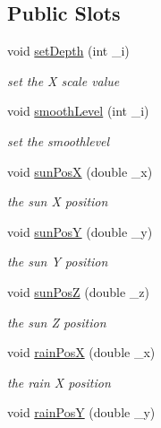 \subsection*{Public Slots}
\begin{DoxyCompactItemize}
\item 
void \hyperlink{classGLWindow_aa977ee3b936a08d1dfc675ac8a2eccad}{setDepth} (int \_\-i)
\begin{DoxyCompactList}\small\item\em set the X scale value \item\end{DoxyCompactList}\item 
void \hyperlink{classGLWindow_a2064b4f973be3388c40bedb9ba27df1f}{smoothLevel} (int \_\-i)
\begin{DoxyCompactList}\small\item\em set the smoothlevel \item\end{DoxyCompactList}\item 
void \hyperlink{classGLWindow_ac04a06844d575e15c9c4d367bec34721}{sunPosX} (double \_\-x)
\begin{DoxyCompactList}\small\item\em the sun X position \item\end{DoxyCompactList}\item 
void \hyperlink{classGLWindow_abd78e6478800ee61d631edbb85307019}{sunPosY} (double \_\-y)
\begin{DoxyCompactList}\small\item\em the sun Y position \item\end{DoxyCompactList}\item 
void \hyperlink{classGLWindow_a56ed4affeadf595cc03e4728fc1a1611}{sunPosZ} (double \_\-z)
\begin{DoxyCompactList}\small\item\em the sun Z position \item\end{DoxyCompactList}\item 
void \hyperlink{classGLWindow_af1a5b08eb2fc001198d7cf874fd57818}{rainPosX} (double \_\-x)
\begin{DoxyCompactList}\small\item\em the rain X position \item\end{DoxyCompactList}\item 
void \hyperlink{classGLWindow_a28cf222f0071c315f388806bbda52688}{rainPosY} (double \_\-y)

\end{DoxyCompactItemize}

